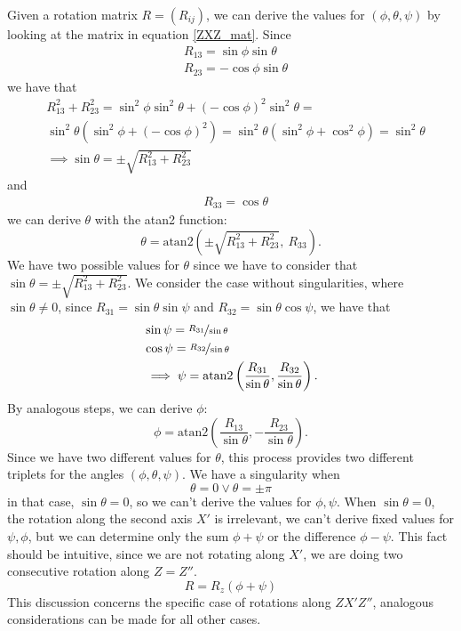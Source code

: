 \documentclass[10pt, letterpaper]{report}
\begin{document}
Given a rotation matrix $R=(R_{ij})$, we can derive the values for $(\phi,\theta,\psi)$ by looking at the matrix in equation \eqref{ZXZ_mat}. Since \begin{align}
    &R_{13}=\sin\phi\sin\theta \\ 
    &R_{23}=-\cos\phi\sin\theta  
\end{align}
we have that \begin{align}
    &R_{13}^2+R_{23}^2=\sin^2\phi\sin^2\theta+(-\cos\phi)^2\sin^2\theta=\\ 
    &\sin^2\theta(\sin^2\phi+(-\cos\phi)^2)= \sin^2\theta(\sin^2\phi+\cos^2\phi)=\sin^2\theta\\ &\implies
    \sin\theta=\pm\sqrt{R_{13}^2+R_{23}^2}
\end{align}
and\begin{align}
    &R_{33}=\cos\theta  
\end{align}
we can derive $\theta$ with the atan2 function:\begin{equation}
    \theta=\text{atan2}\left(
        \pm\sqrt{R_{13}^2+R_{23}^2}, \ R_{33}
    \right).
\end{equation}
We have two possible values for $\theta$ since we have to consider that $\sin\theta=\pm\sqrt{R_{13}^2+R_{23}^2}$.
We consider the case without singularities, where $\sin\theta\ne 0$, since $R_{31}=\sin\theta\sin\psi$ and $R_{32}=\sin\theta\cos\psi$, we have that\begin{align}
    &\sin\psi=\nicefrac{R_{31}}{\sin\theta}\\ 
    &\cos\psi=\nicefrac{R_{32}}{\sin\theta}\\ 
    &\implies \psi=\text{atan2}\left(
        \frac{R_{31}}{\sin\theta}, \frac{R_{32}}{\sin\theta}
    \right).
\end{align}
By analogous steps, we can derive $\phi$:\begin{equation}
     \phi=\text{atan2}\left(
        \frac{R_{13}}{\sin\theta},- \frac{R_{23}}{\sin\theta}
    \right).
\end{equation}
Since we have two different values for $\theta$, this process provides two different triplets for the angles $(\phi,\theta,\psi)$. We have a singularity when\begin{equation}
    \theta=0\lor \theta=\pm\pi
\end{equation}
in that case, $\sin\theta=0$, so we can't derive the values for $\phi,\psi$. When $\sin\theta=0$, the rotation along the second axis $X'$ is irrelevant, we can't derive fixed values for $\psi,\phi$, but we can determine only the sum $\phi+\psi$ or the difference $\phi-\psi$. This fact should be intuitive, since we are not rotating along $X'$, we are doing two consecutive rotation along $Z=Z''$.
$$R=R_z(\phi+\psi)$$
This discussion concerns the specific case of rotations along $ZX'Z''$, analogous considerations can be made for all other cases.
\end{document}
